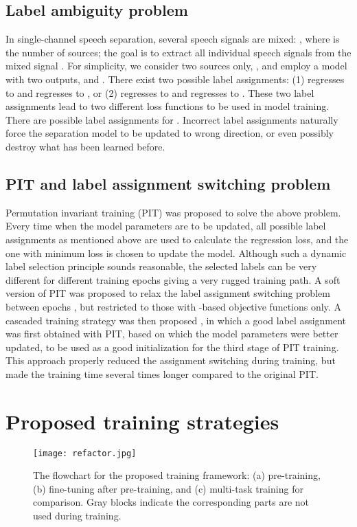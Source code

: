 \documentclass[a4paper]{article}
\begin{document}
\subsection{Label ambiguity problem}
In single-channel speech separation, several speech signals are mixed: , where  is the number of sources; the goal is to extract all individual speech signals  from the mixed signal .
For simplicity, we consider two sources only, , and employ a model with two outputs,  and .
There exist two possible label assignments: (1)  regresses to  and  regresses to , or (2)  regresses to  and  regresses to .
These two label assignments lead to two different loss functions to be used in model training.
There are  possible label assignments for .
Incorrect label assignments naturally force the separation model to be updated to wrong direction, or even possibly destroy what has been learned before.

\subsection{PIT and label assignment switching problem}
Permutation invariant training (PIT) \cite{yu2017permutation} was proposed to solve the above problem.
Every time when the model parameters are to be updated, all possible label assignments as mentioned above are used to calculate the regression loss, and the one with minimum loss is chosen to update the model.
Although such a dynamic label selection principle sounds reasonable, the selected labels can be very different for different training epochs giving a very rugged training path.
A soft version of PIT was proposed to relax the label assignment switching problem between epochs \cite{yousefi2019probabilistic}, but restricted to those with -based objective functions only.
A cascaded training strategy was then proposed \cite{yang2020interrupted}, in which a good label assignment was first obtained with PIT, based on which the model parameters were better updated, to be used as a good initialization for the third stage of PIT training.
This approach properly reduced the assignment switching during training, but made the training time several times longer compared to the original PIT.

\section{Proposed training strategies}
\label{sec:pretrain}

\begin{figure*}[t]
    \centering
    \texttt{[image: refactor.jpg]}
    \caption{The flowchart for the proposed training framework: (a) pre-training, (b) fine-tuning after pre-training, and (c) multi-task training for comparison. Gray blocks indicate the corresponding parts are not used during training.}
    \label{fig:flowchart}
\end{figure*}
\end{document}
